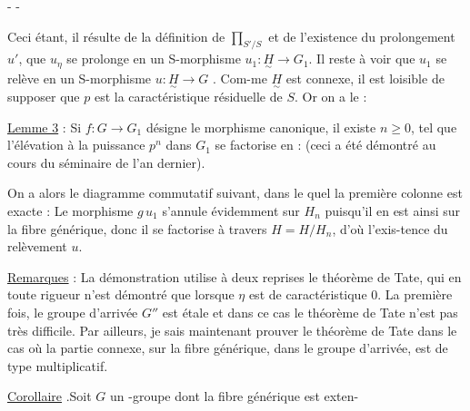 -  -

Ceci étant, il résulte de la définition de $\prod_{S'/S}$ et de l'existence du prolongement $u'$, que $u_\eta$ se prolonge en un S-morphisme $u_1:\underset{\sim}{H}\longrightarrow G_1$. Il reste à voir que $u_1$ se relève en un S-morphisme $u:\underset{\sim}{H}\longrightarrow G$ . Com-me $\underset{\sim}{H}$ est connexe, il est loisible de supposer que $p$ est la caractéristique résiduelle de $S$. Or on a le :

\uline{Lemme 3} : Si $f:G\longrightarrow G_1$ désigne le morphisme canonique,  il existe $n\geq0$, tel que l'élévation à la puissance $p^n$ dans $G_1$ se factorise en :
(ceci a été démontré au cours du séminaire de l'an dernier).

On a alors le diagramme commutatif suivant, dans le quel la première colonne est exacte :
Le morphisme $g\,u_1$ s'annule évidemment sur $H_n$ puisqu'il en est ainsi sur la fibre générique, donc il se factorise à travers $H=H/H_n$, d'où l'exis-tence du relèvement $u$.

\uline{Remarques} : La démonstration utilise à deux reprises le théorème de Tate, qui en toute rigueur n'est démontré que lorsque $\eta$ est de caractéristique $0$. La première fois, le groupe d'arrivée $G''$ est étale et dans ce cas le théorème de Tate n'est pas très difficile. Par ailleurs, je sais maintenant prouver le théorème de Tate dans le cas où la partie connexe, sur la fibre générique, dans le groupe d'arrivée, est de type multiplicatif.

\uline{Corollaire} .Soit $G$ un \inserted{$\eta$}-groupe  dont la fibre générique est exten-

